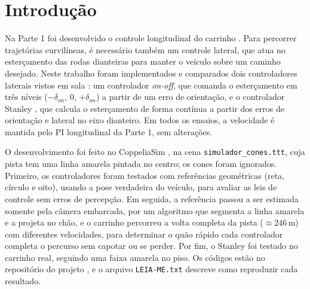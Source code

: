\section{Introdução}\label{sec:introducao}

Na Parte 1 foi desenvolvido o controle longitudinal do carrinho \cite{mozelli2025controlelongitudinal}. Para percorrer trajetórias curvilíneas, é necessário também um controle lateral, que atua no esterçamento das rodas dianteiras para manter o veículo sobre um caminho desejado. Neste trabalho foram implementados e comparados dois controladores laterais vistos em sala \cite{mozelli2025controlelateral}: um controlador \textit{on-off}, que comanda o esterçamento em três níveis ($-\delta_{on}$, $0$, $+\delta_{on}$) a partir de um erro de orientação, e o controlador Stanley \cite{thrun2006stanley,hoffmann2007stanley}, que calcula o esterçamento de forma contínua a partir dos erros de orientação e lateral no eixo dianteiro. Em todos os ensaios, a velocidade é mantida pelo PI longitudinal da Parte 1, sem alterações.

O desenvolvimento foi feito no CoppeliaSim \cite{coppeliasim}, na cena \texttt{simulador\_cones.ttt}, cuja pista tem uma linha amarela pintada no centro; os cones foram ignorados. Primeiro, os controladores foram testados com referências geométricas (reta, círculo e oito), usando a pose verdadeira do veículo, para avaliar as leis de controle sem erros de percepção. Em seguida, a referência passou a ser estimada somente pela câmera embarcada, por um algoritmo que segmenta a linha amarela e a projeta no chão, e o carrinho percorreu a volta completa da pista ($\approx246\,\mathrm{m}$) com diferentes velocidades, para determinar o quão rápido cada controlador completa o percurso sem capotar ou se perder. Por fim, o Stanley foi testado no carrinho real, seguindo uma faixa amarela no piso. Os códigos estão no repositório do projeto \cite{desgovernai2026}, e o arquivo \texttt{LEIA-ME.txt} descreve como reproduzir cada resultado.
